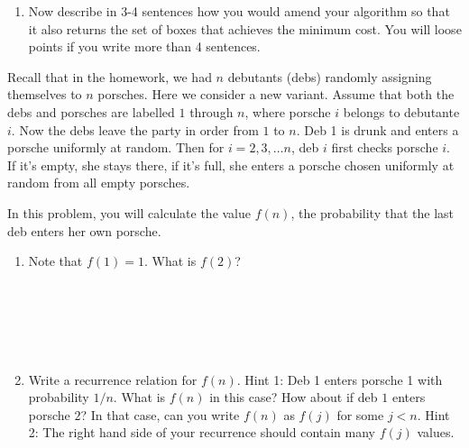 \documentclass[11pt]{article}
\newcommand{\ans}[1]{}
\begin{document}
\begin{enumerate}
\begin{enumerate}
\pagebreak

\item Now describe in 3-4 sentences how you would amend your algorithm so that it also returns the set of boxes that achieves the minimum cost.  You will loose points if you write more than 4 sentences.

\ans{Create a new array $s$ of size $n$.  When filling in the values for $m(i)$, set $s(i)$ to be the number of donuts in the box that achieves the minimum.  After $m[n]$ is computed, set $j \leftarrow n$.  Then until $j=0$, output the value in $s[j]$, and set $j \leftarrow j - s[j]$.}


\end{enumerate}




 


Recall that in the homework, we had $n$ debutants (debs) randomly assigning themselves to $n$ porsches.  Here we consider a new variant.  Assume that both the debs and porsches are labelled $1$ through $n$, where porsche $i$ belongs to debutante $i$.  Now the debs leave the party in order from $1$ to $n$.  Deb 1 is drunk and enters a porsche uniformly at random.  Then for $i = 2, 3, \ldots n$, deb $i$ first checks porsche $i$.  If it's empty, she stays there, if it's full, she enters a porsche chosen uniformly at random from all empty porsches.

In this problem, you will calculate the value $f(n)$, the probability that the last deb enters her own porsche.

\begin{enumerate}

\item Note that $f(1) = 1$.  What is $f(2)$? \ans{$f(2) = 1/2$} \\ \ \\ \ \\ \ \\ \ \\ \ \\

\item Write a recurrence relation for $f(n)$.  Hint 1:  Deb 1 enters porsche 1 with probability $1/n$.  What is $f(n)$ in this case?  How about if deb $1$ enters porsche $2$?  In that case, can you write $f(n)$ as $f(j)$ for some $j < n$.  Hint 2: The right hand side of
your recurrence should contain many $f(j)$ values.  \\ \ \\ \ \\ 


\end{enumerate}
\end{enumerate}
\end{document}
